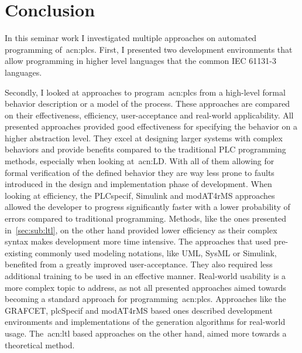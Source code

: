 \chapter{Conclusion}
\label{sec:conclusion}

In this seminar work I investigated multiple approaches on automated programming of~\acrlong{acn:plc}s.
First, I presented two development environments that allow programming in higher level languages that the common IEC 61131-3 languages.

Secondly, I looked at approaches to program~\acrshort{acn:plc}s from a high-level formal behavior description or a model of the process.
These approaches are compared on their effectiveness, efficiency, user-acceptance and real-world applicability.
All presented approaches provided good effectiveness for specifying the behavior on a higher abstraction level.
They excel at designing larger systems with complex behaviors and provide benefits compared to the traditional PLC programming methods, especially when looking at~\acrshort{acn:LD}.
With all of them allowing for formal verification of the defined behavior they are way less prone to faults introduced in the design and implementation phase of development.
When looking at efficiency, the PLCspecif, Simulink and modAT4rMS approaches allowed the developer to progress significantly faster with a lower probability of errors compared to traditional programming.
Methods, like the ones presented in~\ref{sec:sub:ltl}, on the other hand provided lower efficiency as their complex syntax makes development more time intensive.
The approaches that used pre-existing commonly used modeling notations, like UML, SysML or Simulink, benefited from a greatly improved user-acceptance.
They also required less additional training to be used in an effective manner.
Real-world usability is a more complex topic to address, as not all presented approaches aimed towards becoming a standard approach for programming~\acrshort{acn:plc}s.
Approaches like the GRAFCET,  plcSpecif and modAT4rMS based ones described development environments and implementations of the generation algorithms for real-world usage.
The~\acrshort{acn:ltl} based approaches on the other hand, aimed more towards a theoretical method.

